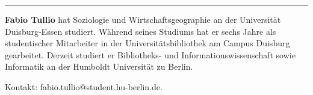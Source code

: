 \begin{center}\rule{0.5\linewidth}{\linethickness}\end{center}

\textbf{Fabio Tullio} hat Soziologie und Wirtschaftsgeographie an der
Universität Duisburg-Essen studiert. Während seines Studiums hat er
sechs Jahre als studentischer Mitarbeiter in der Universitätsbibliothek
am Campus Duisburg gearbeitet. Derzeit studiert er Bibliotheks- und
Informationswissenschaft sowie Informatik an der Humboldt Universität zu
Berlin. 

Kontakt: fabio.tullio@student.hu-berlin.de.
